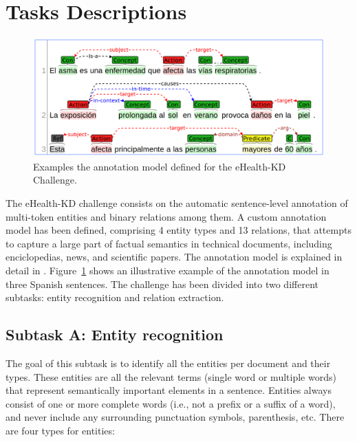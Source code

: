 \documentclass[a4paper,11pt,twocolumn,twoside]{article}
\begin{document}
\section{Tasks Descriptions}\label{sec:task}

\begin{figure}[htb]
  \includegraphics[width=\textwidth]{model.png}
  \caption{Examples the annotation model defined for the eHealth-KD Challenge.\label{fig:model}}
\end{figure}

The eHealth-KD challenge consists on the automatic sentence-level annotation
of multi-token entities and binary relations among them.
A custom annotation model has been defined, comprising 4 entity types and 13 relations,
that attempts to capture a large part of factual semantics in technical documents,
including enciclopedias, news, and scientific papers. The annotation model is explained in detail in . Figure~\ref{fig:model} shows an illustrative example of the annotation model in three Spanish sentences.
The challenge has been divided into two different subtasks: entity recognition and relation extraction.

\subsection{Subtask A: Entity recognition}

The goal of this subtask is to identify all the entities per document and their types. These entities are all the relevant terms (single word or multiple words) that represent semantically important elements in a sentence. Entities always consist of one or more complete words (i.e., not a prefix or a suffix of a word), and never include any surrounding punctuation symbols, parenthesis, etc. There are four types for entities:
\end{document}
